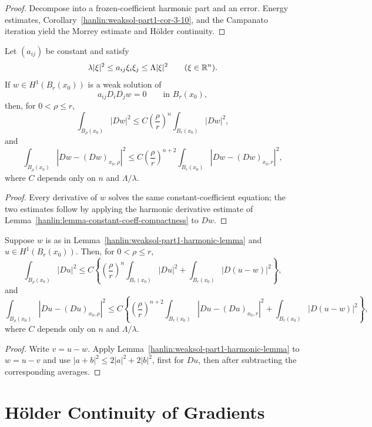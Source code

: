 \begin{proof}
\sketch Decompose into a frozen-coefficient harmonic part and an error.
Energy estimates, Corollary~\ref{hanlin:weaksol-part1-cor-3-10}, and the
Campanato iteration yield the Morrey estimate and H\"older continuity.
\end{proof}

\begin{lemma}\label{hanlin:weaksol-part1-harmonic-lemma}
Let $(a_{ij})$ be constant and satisfy
\[
\lambda|\xi|^2\leq a_{ij}\xi_i\xi_j\leq\Lambda|\xi|^2
\qquad(\xi\in\mathbb{R}^n).
\]
If $w\in H^1(B_r(x_0))$ is a weak solution of
\[
a_{ij}D_iD_jw=0\qquad\text{in }B_r(x_0),
\]
then, for $0<\rho\leq r$,
\[
\int_{B_\rho(x_0)}|Dw|^2
\leq C\left(\frac\rho r\right)^n\int_{B_r(x_0)}|Dw|^2,
\]
and
\[
\int_{B_\rho(x_0)}|Dw-(Dw)_{x_0,\rho}|^2
\leq C\left(\frac\rho r\right)^{n+2}
\int_{B_r(x_0)}|Dw-(Dw)_{x_0,r}|^2,
\]
where $C$ depends only on $n$ and $\Lambda/\lambda$.
\end{lemma}
\begin{proof}
\sketch Every derivative of $w$ solves the same constant-coefficient equation;
the two estimates follow by applying the harmonic derivative estimate of
Lemma~\ref{hanlin:lemma-constant-coeff-compactness} to $Dw$.
\end{proof}

\begin{corollary}\label{hanlin:weaksol-part1-cor-3-10}
Suppose $w$ is as in Lemma~\ref{hanlin:weaksol-part1-harmonic-lemma} and
$u\in H^1(B_r(x_0))$. Then, for
$0<\rho\leq r$,
\[
\int_{B_\rho(x_0)}|Du|^2
\leq C\left\{
\left(\frac\rho r\right)^n\int_{B_r(x_0)}|Du|^2
+\int_{B_r(x_0)}|D(u-w)|^2\right\},
\]
and
\[
\int_{B_\rho(x_0)}|Du-(Du)_{x_0,\rho}|^2
\leq C\left\{
\left(\frac\rho r\right)^{n+2}
\int_{B_r(x_0)}|Du-(Du)_{x_0,r}|^2
+\int_{B_r(x_0)}|D(u-w)|^2\right\},
\]
where $C$ depends only on $n$ and $\Lambda/\lambda$.
\end{corollary}
\begin{proof}
\sketch Write $v=u-w$. Apply
Lemma~\ref{hanlin:weaksol-part1-harmonic-lemma} to $w=u-v$ and use
$|a+b|^2\leq2|a|^2+2|b|^2$, first for $Du$, then after subtracting the
corresponding averages.
\end{proof}

\section{H\"older Continuity of Gradients}

